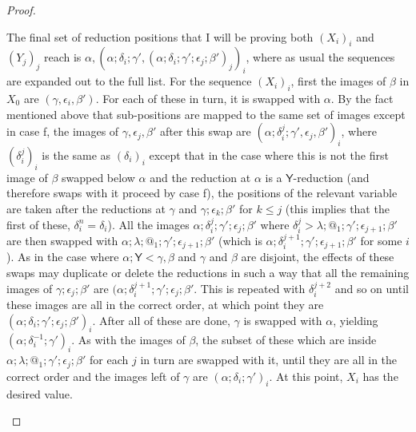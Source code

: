 \documentclass{article}
\newcommand{\tY}{\mathsf{Y}}
\theoremstyle{definition}
\theoremstyle{lemma}
\theoremstyle{remark}
\begin{document}
\begin{proof}
\begin{itemize}
  The final set of reduction positions that I will be proving both $(X_i)_i$ and $(Y_j)_j$ reach is $\alpha, (\alpha;\delta_i;\gamma', (\alpha;\delta_i;\gamma';\epsilon_j;\beta')_j)_i$, where as usual the sequences are expanded out to the full list. For the sequence $(X_i)_i$, first the images of $\beta$ in $X_0$ are $(\gamma,\epsilon_i,\beta')$. For each of these in turn, it is swapped with $\alpha$. By the fact mentioned above that sub-positions are mapped to the same set of images except in case f, the images of $\gamma,\epsilon_j,\beta'$ after this swap are $(\alpha;\delta_i^j;\gamma',\epsilon_j,\beta')_i$, where $(\delta_i^j)_i$ is the same as $(\delta_i)_i$ except that in the case where this is not the first image of $\beta$ swapped below $\alpha$ and the reduction at $\alpha$ is a $\tY$-reduction (and therefore swaps with it proceed by case f), the positions of the relevant variable are taken after the reductions at $\gamma$ and $\gamma;\epsilon_k;\beta'$ for $k \leq j$ (this implies that the first of these, $\delta_i^n = \delta_i$). All the images $\alpha;\delta_i^j;\gamma';\epsilon_j;\beta'$ where $\delta_i^j > \lambda;@_1;\gamma';\epsilon_{j+1};\beta'$ are then swapped with $\alpha;\lambda;@_1;\gamma';\epsilon_{j+1};\beta'$ (which is $\alpha;\delta_i^{j+1};\gamma';\epsilon_{j+1};\beta'$ for some $i$). As in the case where $\alpha;\tY < \gamma, \beta$ and $\gamma$ and $\beta$ are disjoint, the effects of these swaps may duplicate or delete the reductions in such a way that all the remaining images of $\gamma;\epsilon_j;\beta'$ are $(\alpha;\delta_i^{j+1};\gamma';\epsilon_j;\beta'$. This is repeated with $\delta_i^{j+2}$ and so on until these images are all in the correct order, at which point they are $(\alpha;\delta_i;\gamma';\epsilon_j;\beta')_i$. After all of these are done, $\gamma$ is swapped with $\alpha$, yielding $(\alpha;\delta_i^{-1};\gamma')_i$. As with the images of $\beta$, the subset of these which are inside $\alpha;\lambda;@_1;\gamma';\epsilon_j;\beta'$ for each $j$ in turn are swapped with it, until they are all in the correct order and the images left of $\gamma$ are $(\alpha;\delta_i;\gamma')_i$. At this point, $X_i$ has the desired value.
  

\end{itemize}
\end{proof}
\end{document}
